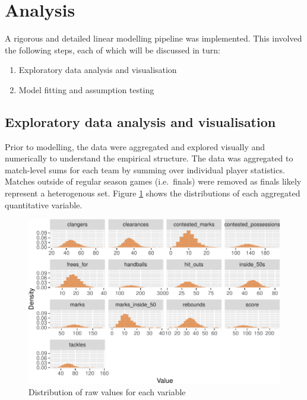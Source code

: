 \documentclass{article}
\begin{document}
\hypertarget{analysis}{%
\section{Analysis}\label{analysis}}

A rigorous and detailed linear modelling pipeline was implemented. This involved the following steps, each of which will be discussed in turn:

\begin{enumerate}
\def\labelenumi{\arabic{enumi}.}
\tightlist
\item
  Exploratory data analysis and visualisation
\item
  Model fitting and assumption testing
\end{enumerate}

\hypertarget{exploratory-data-analysis-and-visualisation}{%
\subsection{Exploratory data analysis and visualisation}\label{exploratory-data-analysis-and-visualisation}}

Prior to modelling, the data were aggregated and explored visually and numerically to understand the empirical structure. The data was aggregated to match-level sums for each team by summing over individual player statistics. Matches outside of regular season games (i.e.~finals) were removed as finals likely represent a heterogenous set. Figure \ref{fig:distplot} shows the distributions of each aggregated quantitative variable.

\begin{figure}
\centering
\includegraphics{OLET5608_TrentHenderson_files/figure-latex/distplot-1.pdf}
\caption{\label{fig:distplot}Distribution of raw values for each variable}
\end{figure}
\end{document}
